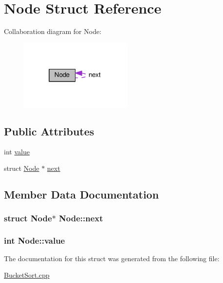 \hypertarget{structNode}{}\section{Node Struct Reference}
\label{structNode}


Collaboration diagram for Node\+:
\nopagebreak
\begin{figure}[H]
\begin{center}
\leavevmode
\includegraphics[width=160pt]{structNode__coll__graph}
\end{center}
\end{figure}
\subsection*{Public Attributes}
\begin{DoxyCompactItemize}
\item 
int \hyperlink{structNode_aaa0cd30d78a90c5a6ab64eb3d58b8f87}{value}
\item 
struct \hyperlink{structNode}{Node} $\ast$ \hyperlink{structNode_af67b110ca1a258b793bf69d306929b22}{next}
\end{DoxyCompactItemize}


\subsection{Member Data Documentation}
\subsubsection[{\texorpdfstring{next}{next}}]{\setlength{\rightskip}{0pt plus 5cm}struct {\bf Node}$\ast$ Node\+::next}\hypertarget{structNode_af67b110ca1a258b793bf69d306929b22}{}\label{structNode_af67b110ca1a258b793bf69d306929b22}
\subsubsection[{\texorpdfstring{value}{value}}]{\setlength{\rightskip}{0pt plus 5cm}int Node\+::value}\hypertarget{structNode_aaa0cd30d78a90c5a6ab64eb3d58b8f87}{}\label{structNode_aaa0cd30d78a90c5a6ab64eb3d58b8f87}


The documentation for this struct was generated from the following file\+:\begin{DoxyCompactItemize}
\item 
\hyperlink{BucketSort_8cpp}{Bucket\+Sort.\+cpp}\end{DoxyCompactItemize}
